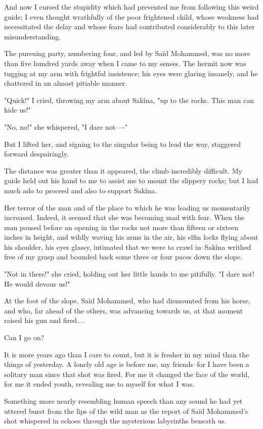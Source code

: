 And now I cursed the stupidity which had prevented me from following
this weird guide; I even thought wrathfully of the poor frightened
child, whose weakness had necessitated the delay and whose fears had
contributed considerably to this later misunderstanding.

The pursuing party, numbering four, and led by Saïd Mohammed, was no
more than five hundred yards away when I came to my senses. The hermit
now was tugging at my arm with frightful insistence; his eyes were
glaring insanely, and he chattered in an almost pitiable manner.

"Quick!" I cried, throwing my arm about Sakîna, "up to the rocks. This
man can hide us!"

"No, no!" she whispered, "I dare not----"

But I lifted her, and signing to the singular being to lead the way,
staggered forward despairingly.

The distance was greater than it appeared, the climb incredibly
difficult. My guide held out his hand to me to assist me to mount the
slippery rocks; but I had much ado to proceed and also to support
Sakîna.

Her terror of the man and of the place to which he was leading us
momentarily increased. Indeed, it seemed that she was becoming mad
with fear. When the man paused before an opening in the rocks not
more than fifteen or sixteen inches in height, and wildly waving
his arms in the air, his elfin locks flying about his shoulder, his
eyes glassy, intimated that we were to crawl in--Sakîna writhed free
of my grasp and bounded back some three or four paces down the slope.

"Not in there!" she cried, holding out her little hands to me
pitifully. "I dare not! He would devour us!"

At the foot of the slope, Saïd Mohammed, who had dismounted from his
horse, and who, far ahead of the others, was advancing towards us,
at that moment raised his gun and fired....

Can I go on?

It is more years ago than I care to count, but it is fresher in my
mind than the things of yesterday. A lonely old age is before me, my
friends--for I have been a solitary man since that shot was fired. For
me it changed the face of the world, for me it ended youth, revealing
me to myself for what I was.

Something more nearly resembling human speech than any sound he had
yet uttered burst from the lips of the wild man as the report of Saïd
Mohammed's shot whispered in echoes through the mysterious labyrinths
beneath us.


